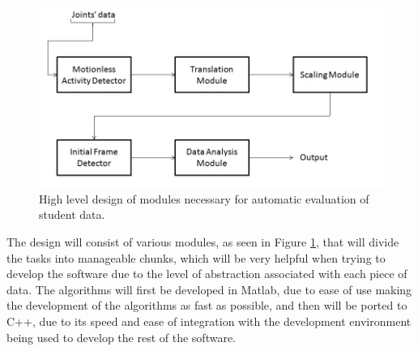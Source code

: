\documentclass[10pt]{article}
\begin{document}
\begin{figure}[H]
\centering
\includegraphics[scale=0.4]{data_analysis_modules.jpg}
\caption{High level design of modules necessary for automatic evaluation of student data.}
\label{modules}
\end{figure}
 
\noindent The design will consist of various modules, as seen in Figure \ref{modules}, that will divide the tasks into manageable chunks, which will be very helpful when trying to develop the software due to the level of abstraction associated with each piece of data. The algorithms will first be developed in Matlab, due to ease of use making the development of the algorithms as fast as possible, and then will be ported to C++, due to its speed and ease of integration with the development environment being used to develop the rest of the software. 
\end{document}
